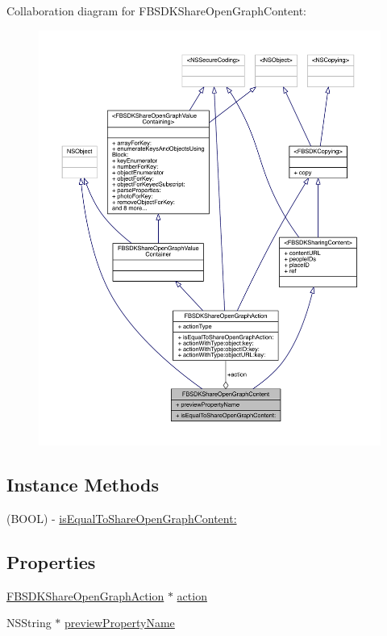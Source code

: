 Collaboration diagram for F\-B\-S\-D\-K\-Share\-Open\-Graph\-Content\-:
\nopagebreak
\begin{figure}[H]
\begin{center}
\leavevmode
\includegraphics[width=350pt]{interface_f_b_s_d_k_share_open_graph_content__coll__graph}
\end{center}
\end{figure}
\subsection*{Instance Methods}
\begin{DoxyCompactItemize}
\item 
(B\-O\-O\-L) -\/ \hyperlink{interface_f_b_s_d_k_share_open_graph_content_a8f2227b11581744df6453cb93ab87fd5}{is\-Equal\-To\-Share\-Open\-Graph\-Content\-:}
\end{DoxyCompactItemize}
\subsection*{Properties}
\begin{DoxyCompactItemize}
\item 
\hyperlink{interface_f_b_s_d_k_share_open_graph_action}{F\-B\-S\-D\-K\-Share\-Open\-Graph\-Action} $\ast$ \hyperlink{interface_f_b_s_d_k_share_open_graph_content_ad9e4ab55026e417b3c04f7b73d53f392}{action}
\item 
N\-S\-String $\ast$ \hyperlink{interface_f_b_s_d_k_share_open_graph_content_a138537cb75dbeab1a52aaf27b3bb60e8}{preview\-Property\-Name}
\end{DoxyCompactItemize}


